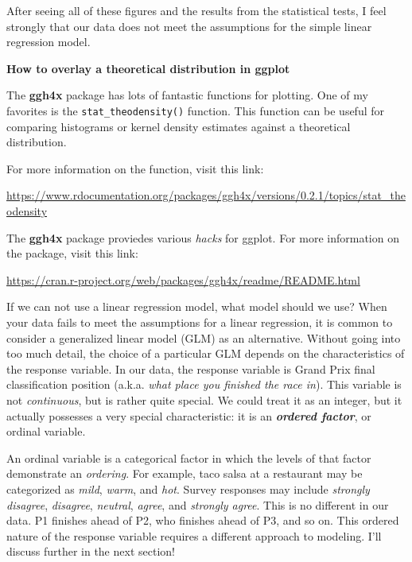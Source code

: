 \documentclass[
]{book}
\begin{document}
After seeing all of these figures and the results from the statistical tests, I feel strongly that our data does not meet the assumptions for the simple linear regression model.

\begin{blackbox}

\begin{center}
\textbf{How to overlay a theoretical distribution in ggplot}

\end{center}

The \textbf{ggh4x} package has lots of fantastic functions for plotting. One of my favorites is the \texttt{stat\_theodensity()} function. This function can be useful for comparing histograms or kernel density estimates against a theoretical distribution.

For more information on the function, visit this link:

\url{https://www.rdocumentation.org/packages/ggh4x/versions/0.2.1/topics/stat_theodensity}

The \textbf{ggh4x} package proviedes various \emph{hacks} for ggplot. For more information on the package, visit this link:

\url{https://cran.r-project.org/web/packages/ggh4x/readme/README.html}

\end{blackbox}

If we can not use a linear regression model, what model should we use? When your data fails to meet the assumptions for a linear regression, it is common to consider a generalized linear model (GLM) as an alternative. Without going into too much detail, the choice of a particular GLM depends on the characteristics of the response variable. In our data, the response variable is Grand Prix final classification position (a.k.a. \emph{what place you finished the race in}). This variable is not \emph{continuous}, but is rather quite special. We could treat it as an integer, but it actually possesses a very special characteristic: it is an \textbf{\emph{ordered factor}}, or ordinal variable.

An ordinal variable is a categorical factor in which the levels of that factor demonstrate an \emph{ordering}. For example, taco salsa at a restaurant may be categorized as \emph{mild}, \emph{warm}, and \emph{hot}. Survey responses may include \emph{strongly disagree}, \emph{disagree}, \emph{neutral}, \emph{agree}, and \emph{strongly agree}. This is no different in our data. P1 finishes ahead of P2, who finishes ahead of P3, and so on. This ordered nature of the response variable requires a different approach to modeling. I'll discuss further in the next section!
\end{document}
